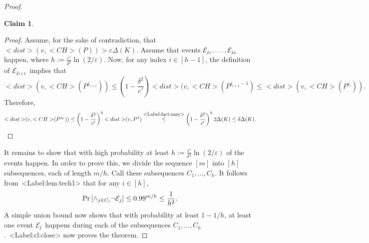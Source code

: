 \documentclass[11pt,letterpaper]{article}
\newcounter{note}[section]
\def\mathsf#1{<#1>}%
\def\Cref#1{<Label:#1>}%
\newtheorem{claim}[theorem]{Claim}
\theoremstyle{definition}
\theoremstyle{remark}
\newcommand{\CH}{{\mathsf {CH}}}
\newcommand{\dist}{{\mathsf{dist}}}
\newcommand{\cE}{{\cal E}}
\begin{document}
\begin{proof}
\begin{claim}
\end{claim}
\begin{proof}
Assume, for the sake of contradiction, that $\dist(v,\CH(P)) > \varepsilon \Delta(K)$. 
Assume that events $\cE_{j_1}, \ldots, \cE_{j_h}$ happen, where $h :=\frac{c'}{\delta^2} \ln(2/\varepsilon). $ Now, for any index $i \in [h-1]$, the definition of $\cE_{j_{i+1}}$ implies that 
$$\dist(v, \CH(P^{j_{i+1}})) \leq \left( 1 - \frac{\delta^2}{c'} \right) \dist(v, \CH(P^{j_{i+1}-1}) \leq  \dist(v, \CH(P^{j_{i}})).$$
Therefore, 
$$\dist(v, \CH(P^{j_h})) \leq \left( 1 - \frac{\delta^2}{c'} \right)^h \dist(v, P^1) 
\stackrel{\mbox{\small{\Cref{fact:easy}}}}{\leq} \left( 1 - \frac{\delta^2}{c'} \right)^h 2 \Delta(K) \leq \delta \Delta(K). $$
\end{proof}

It remains to show that with high probability at least $h :=\frac{c'}{\delta^2} \ln(2/\varepsilon) $
of the events happen. In order to prove this, we divide the sequence $[m]$ into $[h]$ subsequences, each of length $m/h$. Call these subsequences $C_1, \ldots, C_h$. It follows from~\Cref{lem:tech1} that for any $i \in [h]$, 
$$ \Pr \left[ \wedge_{j \in C_i} \neg \cE_j \right] \leq 0.99^{m/h} \leq \frac{1}{h^2}.$$
A simple union bound now shows that with probability at least $1-1/h$, at least one event $\cE_j$ happens during each of the subsequences $C_1, \ldots, C_h$.~\Cref{cl:close} now proves the theorem. 



\end{proof}
\end{document}
